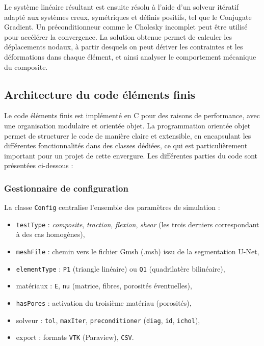 \documentclass[a4paper,11pt]{article}
\begin{document}
Le système linéaire résultant est ensuite résolu à l'aide d'un solveur itératif adapté aux systèmes creux, symétriques et définis positifs, tel que le Conjugate Gradient. Un préconditionneur comme le Cholesky incomplet peut être utilisé pour accélérer la convergence. La solution obtenue permet de calculer les déplacements nodaux, à partir desquels on peut dériver les contraintes et les déformations dans chaque élément, et ainsi analyser le comportement mécanique du composite.

\subsection{Architecture du code éléments finis}

Le code éléments finis est implémenté en C pour des raisons de performance, avec une organisation modulaire et orientée objet. La programmation orientée objet permet de structurer le code de manière claire et extensible, en encapsulant les différentes fonctionnalités dans des classes dédiées, ce qui est particulièrement important pour un projet de cette envergure. Les différentes parties du code sont présentées ci-dessous :
\subsubsection*{Gestionnaire de configuration}

La classe \texttt{Config} centralise l’ensemble des paramètres de simulation :

\begin{itemize}
    \item[$\bullet$] \texttt{testType} : \textit{composite}, \textit{traction}, \textit{flexion}, \textit{shear} (les trois derniers correspondant à des cas homogènes),
    \item[$\bullet$] \texttt{meshFile} : chemin vers le fichier Gmsh (.msh) issu de la segmentation U-Net,
    \item[$\bullet$] \texttt{elementType} : \texttt{P1} (triangle linéaire) ou \texttt{Q1} (quadrilatère bilinéaire),
    \item[$\bullet$] matériaux : \texttt{E}, \texttt{nu} (matrice, fibres, porosités éventuelles),
    \item[$\bullet$] \texttt{hasPores} : activation du troisième matériau (porosités),
    \item[$\bullet$] solveur : \texttt{tol}, \texttt{maxIter}, \texttt{preconditioner} (\texttt{diag}, \texttt{id}, \texttt{ichol}),
    \item[$\bullet$] export : formats \texttt{VTK} (Paraview), \texttt{CSV}.
\end{itemize}
\end{document}
